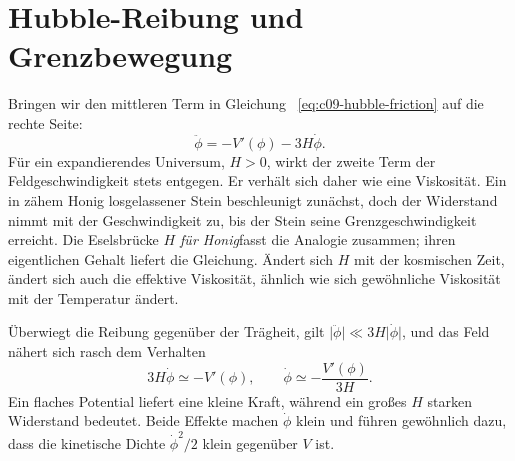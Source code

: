 \begin{classroomqa}
\end{classroomqa}

\section{Hubble-Reibung und Grenzbewegung}

Bringen wir den mittleren Term in Gleichung ~\eqref{eq:c09-hubble-friction} auf die rechte Seite:
\begin{equation}
\ddot\phi=-V'(\phi)-3H\dot\phi.
\end{equation}Für ein expandierendes Universum, \(H>0\), wirkt der zweite Term der Feldgeschwindigkeit stets entgegen. Er verhält sich daher wie eine Viskosität. Ein in zähem Honig losgelassener Stein beschleunigt zunächst, doch der Widerstand nimmt mit der Geschwindigkeit zu, bis der Stein seine Grenzgeschwindigkeit erreicht. Die Eselsbrücke \emph{\(H\) für Honig}fasst die Analogie zusammen; ihren eigentlichen Gehalt liefert die Gleichung. Ändert sich \(H\) mit der kosmischen Zeit, ändert sich auch die effektive Viskosität, ähnlich wie sich gewöhnliche Viskosität mit der Temperatur ändert.

Überwiegt die Reibung gegenüber der Trägheit, gilt \(\lvert\ddot\phi\rvert\ll3H\lvert\dot\phi\rvert\), und das Feld nähert sich rasch dem Verhalten
\begin{equation}
3H\dot\phi\simeq -V'(\phi),
\qquad
\dot\phi\simeq-\frac{V'(\phi)}{3H}.
\label{eq:c09-terminal}
\end{equation}Ein flaches Potential liefert eine kleine Kraft, während ein großes \(H\) starken Widerstand bedeutet. Beide Effekte machen \(\dot\phi\) klein und führen gewöhnlich dazu, dass die kinetische Dichte \(\dot\phi^2/2\) klein gegenüber \(V\) ist.

\begin{classroomqa}
\end{classroomqa}


